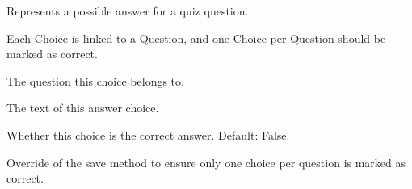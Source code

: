 \documentclass[letterpaper,10pt,english]{sphinxmanual}
\begin{document}
\begin{fulllineitems}
\label{\detokenize{models:Choice}}
\pysigstartsignatures
{}
\pysigstopsignatures
\sphinxAtStartPar
Represents a possible answer for a quiz question.

\sphinxAtStartPar
Each Choice is linked to a Question, and one Choice per Question
should be marked as correct.

\begin{fulllineitems}
\label{\detokenize{models:Choice.question}}
\pysigstartsignatures
{}
\pysigstopsignatures
\sphinxAtStartPar
The question this choice belongs to.

\end{fulllineitems}


\begin{fulllineitems}
\label{\detokenize{models:Choice.text}}
\pysigstartsignatures
{}
\pysigstopsignatures
\sphinxAtStartPar
The text of this answer choice.

\end{fulllineitems}


\begin{fulllineitems}
\label{\detokenize{models:Choice.is_correct}}
\pysigstartsignatures
{}
\pysigstopsignatures
\sphinxAtStartPar
Whether this choice is the correct answer.
Default: False.

\end{fulllineitems}


\begin{fulllineitems}
\label{\detokenize{models:Choice.save}}
\pysigstartsignatures
{}
\pysigstopsignatures
\sphinxAtStartPar
Override of the save method to ensure only one choice
per question is marked as correct.

\end{fulllineitems}


\end{fulllineitems}
\end{document}
